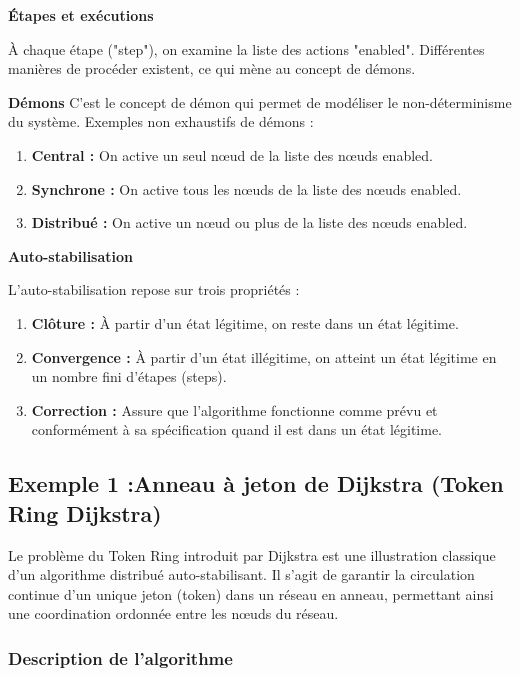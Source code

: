 \documentclass[11pt]{article}
\begin{document}
\textbf{\textbf{Étapes et exécutions}}

À chaque étape ("step"), on examine la liste des actions "enabled". 
Différentes manières de procéder existent, ce qui mène au concept de démons.

\textbf{\textbf{Démons}}
C'est le concept de démon qui permet de modéliser le non-déterminisme du système.
Exemples non exhaustifs de démons :
\begin{enumerate}
\item \textbf{\textbf{Central :}} On active un seul nœud de la liste des nœuds enabled.
\item \textbf{\textbf{Synchrone :}} On active tous les nœuds de la liste des nœuds enabled.
\item \textbf{\textbf{Distribué :}} On active un nœud ou plus de la liste des nœuds enabled.
\end{enumerate}

\textbf{\textbf{Auto-stabilisation}}

L'auto-stabilisation repose sur trois propriétés :
\begin{enumerate}
\item \textbf{\textbf{Clôture :}} À partir d'un état légitime, on reste dans un état légitime.
\item \textbf{\textbf{Convergence :}} À partir d'un état illégitime, on atteint un état légitime en un nombre fini d'étapes (steps).
\item \textbf{\textbf{Correction :}} Assure que l'algorithme fonctionne comme prévu et conformément à sa spécification quand il est dans un état légitime.
\end{enumerate}



\subsection{Exemple 1 :Anneau à jeton de Dijkstra (Token Ring Dijkstra)}
\label{sec:orgf4f240e}

Le problème du Token Ring introduit par Dijkstra est une illustration classique d'un algorithme distribué auto-stabilisant. 
Il s'agit de garantir la circulation continue d'un unique jeton (token) dans un réseau en anneau, permettant ainsi une coordination ordonnée entre les nœuds du réseau.

\subsubsection{Description de l'algorithme}
\label{sec:org16c53b9}
\end{document}
